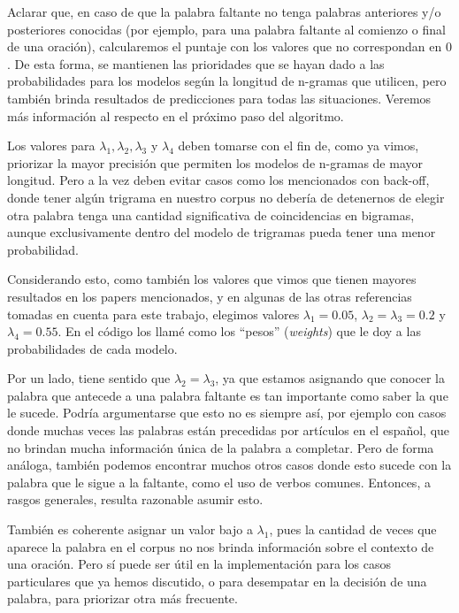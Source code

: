 \documentclass[a4paper]{article}
\begin{document}
\begin{enumerate}
        Aclarar que, en caso de que la palabra faltante no tenga palabras anteriores y/o posteriores conocidas (por ejemplo, para una palabra faltante al comienzo o final de una oración), calcularemos el puntaje con los valores que no correspondan en $0$. De esta forma, se mantienen las prioridades que se hayan dado a las probabilidades para los modelos según la longitud de n-gramas que utilicen, pero también brinda resultados de predicciones para todas las situaciones. Veremos más información al respecto en el próximo paso del algoritmo.

        Los valores para $\lambda_1, \lambda_2, \lambda_3$ y $\lambda_4$ deben tomarse con el fin de, como ya vimos, priorizar la mayor precisión que permiten los modelos de n-gramas de mayor longitud. Pero a la vez deben evitar casos como los mencionados con back-off, donde tener algún trigrama en nuestro corpus no debería de detenernos de elegir otra palabra tenga una cantidad significativa de coincidencias en bigramas, aunque exclusivamente dentro del modelo de trigramas pueda tener una menor probabilidad.

        Considerando esto, como también los valores que vimos que tienen mayores resultados en los papers mencionados\cite{Bhuyan2020}\cite{Samanta2013ASR}, y en algunas de las otras referencias tomadas en cuenta para este trabajo\cite{TdsGen}, elegimos valores $\lambda_1 = 0.05$, $\lambda_2 = \lambda_3 = 0.2$ y $\lambda_4 = 0.55$. En el código los llamé como los ``pesos'' (\textit{weights}) que le doy a las probabilidades de cada modelo.

        Por un lado, tiene sentido que $\lambda_2 = \lambda_3$, ya que estamos asignando que conocer la palabra que antecede a una palabra faltante es tan importante como saber la que le sucede. Podría argumentarse que esto no es siempre así, por ejemplo con casos donde muchas veces las palabras están precedidas por artículos en el español, que no brindan mucha información única de la palabra a completar. Pero de forma análoga, también podemos encontrar muchos otros casos donde esto sucede con la palabra que le sigue a la faltante, como el uso de verbos comunes. Entonces, a rasgos generales, resulta razonable asumir esto.

        También es coherente asignar un valor bajo a $\lambda_1$, pues la cantidad de veces que aparece la palabra en el corpus no nos brinda información sobre el contexto de una oración. Pero sí puede ser útil en la implementación para los casos particulares que ya hemos discutido, o para desempatar en la decisión de una palabra, para priorizar otra más frecuente.


\end{enumerate}
\end{document}
